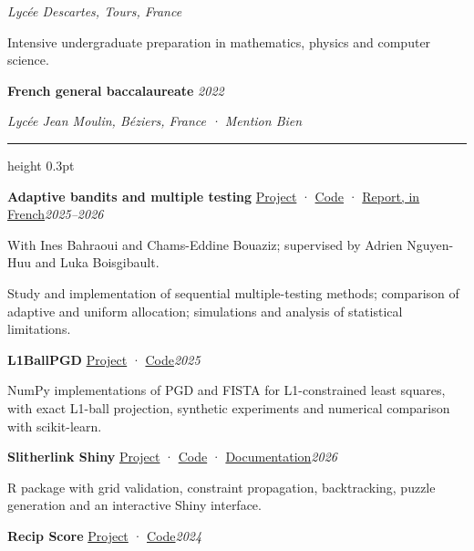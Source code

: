 \documentclass[a4paper,11pt]{article}
\newcommand{\cvsection}[1]{\par\vspace{7pt}{\fontsize{12}{14}\selectfont\scshape #1}\par\vspace{2pt}\hrule height 0.3pt\vspace{4pt}}
\newcommand{\cventry}[3]{\par\vspace{3pt}\textbf{#1} #3\hfill{\fontsize{9.8}{11.5}\selectfont\textit{#2}}\par}
\newenvironment{cvitems}{\begin{list}{\textbullet}{\setlength{\leftmargin}{1.1em}\setlength{\labelsep}{0.35em}\setlength{\itemsep}{1pt}\setlength{\topsep}{1pt}\setlength{\parsep}{0pt}\setlength{\partopsep}{0pt}}}{\end{list}}
\begin{document}
\textit{Lycée Descartes, Tours, France}\\[1pt]
\begin{cvitems}
\item Intensive undergraduate preparation in mathematics, physics and computer science.
\end{cvitems}
\cventry{French general baccalaureate}{2022}{}
\textit{Lycée Jean Moulin, Béziers, France · \textit{Mention Bien}}\\[1pt]
\cvsection{Selected projects}
\cventry{Adaptive bandits and multiple testing}{2025--2026}{{\fontsize{9}{10.5}\selectfont\enspace \href{https://marouanedaoudi.github.io/projets/bandit-simulation/}{Project} · \href{https://github.com/Chams22/bandit_approach_simulation}{Code} · \href{https://marouanedaoudi.github.io/uploads/bandit.pdf}{Report, in French}}}
{\fontsize{9.7}{11.5}\selectfont With Ines Bahraoui and Chams-Eddine Bouaziz; supervised by Adrien Nguyen-Huu and Luka Boisgibault.}\par
\begin{cvitems}
\item Study and implementation of sequential multiple-testing methods; comparison of adaptive and uniform allocation; simulations and analysis of statistical limitations.
\end{cvitems}
\cventry{L1BallPGD}{2025}{{\fontsize{9}{10.5}\selectfont\enspace \href{https://marouanedaoudi.github.io/projets/pgd/}{Project} · \href{https://github.com/marouanedaoudi/L1BallPGD}{Code}}}
\begin{cvitems}
\item NumPy implementations of PGD and FISTA for L1-constrained least squares, with exact L1-ball projection, synthetic experiments and numerical comparison with scikit-learn.
\end{cvitems}
\cventry{Slitherlink Shiny}{2026}{{\fontsize{9}{10.5}\selectfont\enspace \href{https://marouanedaoudi.github.io/projets/slitherlink-shiny/}{Project} · \href{https://github.com/marouanedaoudi/slitherlink-shiny}{Code} · \href{https://marouanedaoudi.github.io/slitherlink-shiny/}{Documentation}}}
\begin{cvitems}
\item R package with grid validation, constraint propagation, backtracking, puzzle generation and an interactive Shiny interface.
\end{cvitems}
\cventry{Recip Score}{2024}{{\fontsize{9}{10.5}\selectfont\enspace \href{https://marouanedaoudi.github.io/projets/recipscore/}{Project} · \href{https://github.com/akram3409/recip_score}{Code}}}
\end{document}
